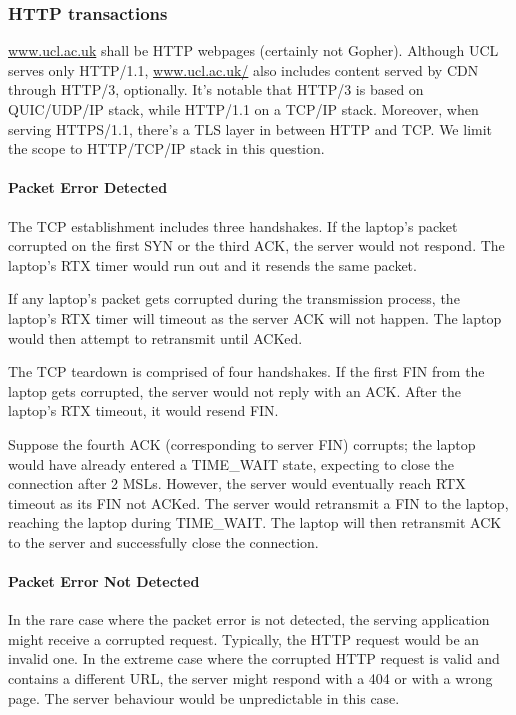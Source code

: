 \documentclass[12pt]{article}
\begin{document}
\subsubsection{HTTP transactions}

\url{www.ucl.ac.uk} shall be HTTP webpages (certainly not Gopher). Although UCL serves only HTTP/1.1, \url{www.ucl.ac.uk/} also includes content served by CDN through HTTP/3, optionally. It's notable that HTTP/3 is based on QUIC/UDP/IP stack, while HTTP/1.1 on a TCP/IP stack. Moreover, when serving HTTPS/1.1, there's a TLS layer in between HTTP and TCP. We limit the scope to HTTP/TCP/IP stack in this question.

\paragraph{Packet Error Detected}

The TCP establishment includes three handshakes. If the laptop's packet corrupted on the first SYN or the third ACK, the server would not respond. The laptop's RTX timer would run out and it resends the same packet.

If any laptop's packet gets corrupted during the transmission process, the laptop's RTX timer will timeout as the server ACK will not happen. The laptop would then attempt to retransmit until ACKed.

The TCP teardown is comprised of four handshakes. If the first FIN from the laptop gets corrupted, the server would not reply with an ACK. After the laptop's RTX timeout, it would resend FIN.

Suppose the fourth ACK (corresponding to server FIN) corrupts; the laptop would have already entered a TIME\_WAIT state, expecting to close the connection after 2 MSLs. However, the server would eventually reach RTX timeout as its FIN not ACKed. The server would retransmit a FIN to the laptop, reaching the laptop during TIME\_WAIT. The laptop will then retransmit ACK to the server and successfully close the connection.

\paragraph{Packet Error Not Detected}

In the rare case where the packet error is not detected, the serving application might receive a corrupted request. Typically, the HTTP request would be an invalid one. In the extreme case where the corrupted HTTP request is valid and contains a different URL, the server might respond with a 404 or with a wrong page. The server behaviour would be unpredictable in this case.
\end{document}
